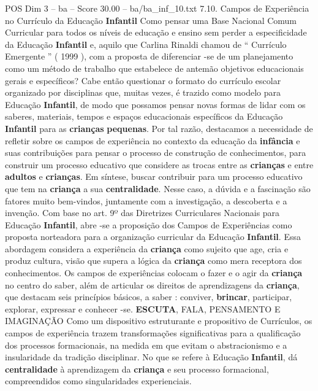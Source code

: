 \begin{textsample}{POS Dim 3 – ba – Score 30.00 – ba/ba\_inf\_10.txt}  \label{ex:f3_pos_171}
7.10.
Campos de Experiência no Currículo da Educação \textbf{Infantil} Como pensar uma Base Nacional Comum Curricular para todos os níveis de educação e ensino sem perder a especificidade da Educação \textbf{Infantil} e, aquilo que Carlina Rinaldi chamou de “ Currículo Emergente ” ( 1999 ), com a proposta de diferenciar -se de um planejamento como um método de trabalho que estabelece de antemão objetivos educacionais gerais e específicos?
Cabe então questionar o formato do currículo escolar organizado por disciplinas que, muitas vezes, é trazido como modelo para Educação \textbf{Infantil}, de modo que possamos pensar novas formas de lidar com os saberes, materiais, tempos e espaços educacionais específicos da Educação \textbf{Infantil} para as \textbf{crianças} \textbf{pequenas}.
Por tal razão, destacamos a necessidade de refletir sobre os campos de experiência no contexto da educação da \textbf{infância} e suas contribuições para pensar o processo de construção de conhecimentos, para construir um processo educativo que considere as trocas entre as \textbf{crianças} e entre \textbf{adultos} e \textbf{crianças}.
Em síntese, buscar contribuir para um processo educativo que tem na \textbf{criança} a sua \textbf{centralidade}.
Nesse caso, a dúvida e a fascinação são fatores muito bem-vindos, juntamente com a investigação, a descoberta e a invenção.
Com base no art. 9º das Diretrizes Curriculares Nacionais para Educação \textbf{Infantil}, abre -se a proposição dos Campos de Experiências como proposta norteadora para a organização curricular da Educação \textbf{Infantil}.
Essa abordagem considera a experiência da \textbf{criança} como sujeito que age, cria e produz cultura, visão que supera a lógica da \textbf{criança} como mera receptora dos conhecimentos.
Os campos de experiências colocam o fazer e o agir da \textbf{criança} no centro do saber, além de articular os direitos de aprendizagens da \textbf{criança}, que destacam seis princípios básicos, a saber : conviver, \textbf{brincar}, participar, explorar, expressar e conhecer -se. \textbf{ESCUTA}, FALA, PENSAMENTO E IMAGINAÇÃO Como um dispositivo estruturante e propositivo de Currículos, os campos de experiência trazem transformações significativas para a qualificação dos processos formacionais, na medida em que evitam o abstracionismo e a insularidade da tradição disciplinar.
No que se refere à Educação \textbf{Infantil}, dá \textbf{centralidade} à aprendizagem da \textbf{criança} e seu processo formacional, compreendidos como singularidades experienciais.

\end{textsample}
